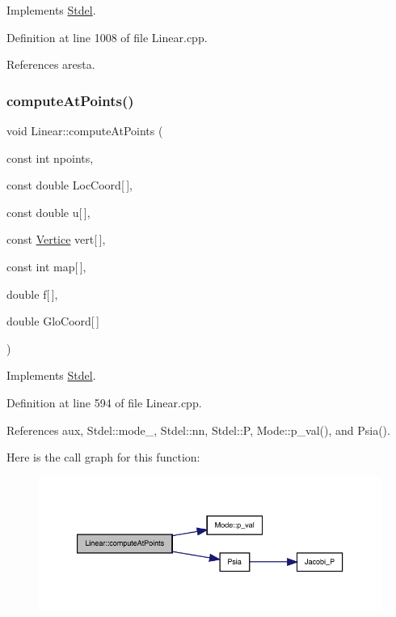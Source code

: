 Implements \hyperlink{classStdel_a69b8ef7def7891fcb2d5d8fd9b75bdc8}{Stdel}.



Definition at line 1008 of file Linear.\+cpp.



References aresta.

\mbox{\label{classLinear_a1d0c5885e756d828bfe63bc9021bf20e}} 
\subsubsection{\texorpdfstring{compute\+At\+Points()}{computeAtPoints()}}
{\footnotesize\ttfamily void Linear\+::compute\+At\+Points (\begin{DoxyParamCaption}\item[{const int}]{npoints,  }\item[{const double}]{Loc\+Coord\mbox{[}$\,$\mbox{]},  }\item[{const double}]{u\mbox{[}$\,$\mbox{]},  }\item[{const \hyperlink{structVertice}{Vertice}}]{vert\mbox{[}$\,$\mbox{]},  }\item[{const int}]{map\mbox{[}$\,$\mbox{]},  }\item[{double}]{f\mbox{[}$\,$\mbox{]},  }\item[{double}]{Glo\+Coord\mbox{[}$\,$\mbox{]} }\end{DoxyParamCaption})\hspace{0.3cm}{\ttfamily [virtual]}}



Implements \hyperlink{classStdel_a03e038055d238608efce470629863c36}{Stdel}.



Definition at line 594 of file Linear.\+cpp.



References aux, Stdel\+::mode\+\_\+, Stdel\+::nn, Stdel\+::P, Mode\+::p\+\_\+val(), and Psia().

Here is the call graph for this function\+:
\nopagebreak
\begin{figure}[H]
\begin{center}
\leavevmode
\includegraphics[width=350pt]{classLinear_a1d0c5885e756d828bfe63bc9021bf20e_cgraph}
\end{center}
\end{figure}
\mbox{\label{classLinear_a063af701ae75d39c1aba9674a030ecdd}} 
